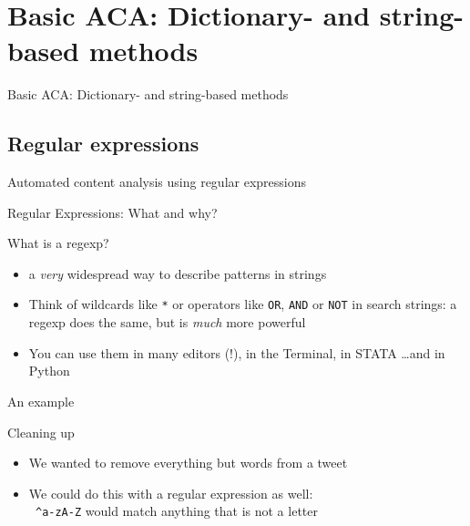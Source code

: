 \documentclass{beamer}
\begin{document}
\section[Basic ACA]{Basic ACA: Dictionary- and string-based methods}

\begin{frame}
	Basic ACA: Dictionary- and string-based methods
\end{frame}

\subsection{Regular expressions}

\begin{frame}
Automated content analysis using regular expressions
\end{frame}

\begin{frame}{Regular Expressions: What and why?}
\begin{block}{What is a regexp?}
\begin{itemize}
\item<1-> a \emph{very} widespread way to describe patterns in strings
\item<2-> Think of wildcards like {\tt{*}} or operators like {\tt{OR}}, {\tt{AND}} or {\tt{NOT}} in search strings: a regexp does the same, but is \emph{much} more powerful
\item<3-> You can use them in many editors (!), in the Terminal, in STATA \ldots and in Python
\end{itemize}
\end{block}
\end{frame}

\begin{frame}{An example}
\begin{block}{Cleaning up}
\begin{itemize}
\item We wanted to remove everything but words from a tweet
\item We could do this with a regular expression as well: \\
{\tt{ \lbrack \^{}a-zA-Z\rbrack}} would match anything that is not a letter
\end{itemize}
\end{block}
\end{frame}
\end{document}
